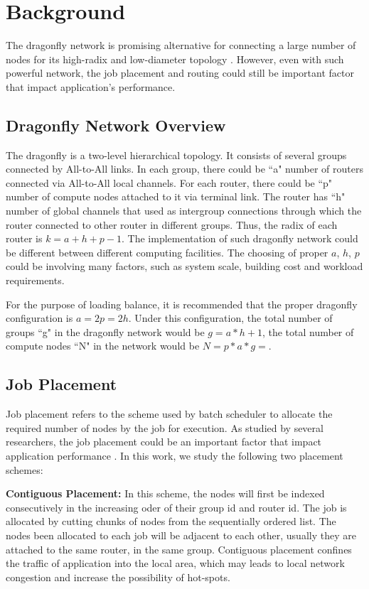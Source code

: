 \documentclass[conference,compsoc]{IEEEtran}
\begin{document}
\section{Background}
\label{sec:background}
The dragonfly network is promising alternative for connecting a large number of nodes for its high-radix and low-diameter topology\cite{dally-dragonfly} \cite{kim-micro} \cite{faanes}. However, even with such powerful network, the job placement and routing could still be important factor that impact application's performance. 


\subsection{Dragonfly Network Overview}
\label{sec:network}
The dragonfly is a two-level hierarchical topology. It consists of several groups connected by All-to-All links. In each group, there could be ``a" number of routers connected via All-to-All local channels. For each router, there could be ``p" number of compute nodes attached to it via terminal link. The router has ``h" number of global channels that used as intergroup connections through which the router connected to other router in different groups. Thus, the radix of each router is $k = a+h+p-1$. The implementation of such dragonfly network could be different between different computing facilities. The choosing of proper $a$, $h$, $p$ could be involving many factors, such as system scale, building cost and workload requirements. 

For the purpose of loading balance, it is recommended that the proper dragonfly configuration is $a=2p=2h$\cite{kim-micro}. Under this configuration, the total number of groups ``g" in the dragonfly network would be $g = a*h+1 $, the total number of compute nodes ``N" in the network would be $N = p*a*g = $.


\subsection{Job Placement}
\label{sec:placement-routing}

Job placement refers to the scheme used by batch scheduler to allocate the required number of nodes by the job for execution. As studied by several researchers, the job placement could be an important factor that impact application performance \cite{hoefler-hpdc14} \cite{bhatele-sc11} \cite{jain-sc14}. In this work, we study the following two placement schemes:

\textbf{Contiguous Placement:} In this scheme, the nodes will first be indexed consecutively in the increasing oder of their group id and router id. The job is allocated by cutting chunks of nodes from the sequentially ordered list. The nodes been allocated to each job will be adjacent to each other, usually they are attached to the same router, in the same group. Contiguous placement confines the traffic of application into the local area, which may leads to local network congestion and increase the possibility of hot-spots. 
\end{document}
